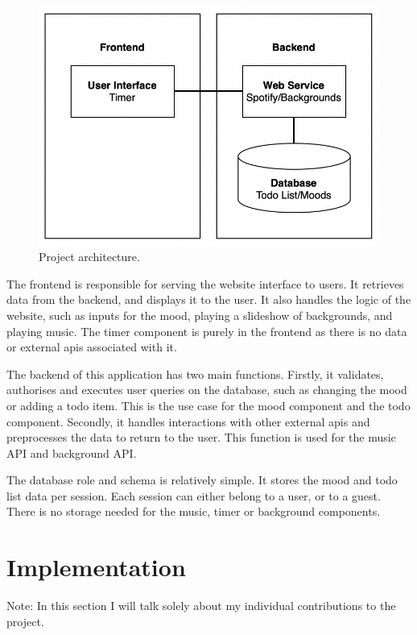 \documentclass[conference]{IEEEtran}
\begin{document}
\begin{figure}[htbp]
\centerline{\includegraphics[width = \linewidth]{project-architecture.png}}
\caption{Project architecture.}
\label{project-architecture}
\end{figure}

The frontend is responsible for serving the website interface to users. It retrieves data from the backend, and displays it to the user. It also handles the logic of the website, such as inputs for the mood, playing a slideshow of backgrounds, and playing music. The timer component is purely in the frontend as there is no data or external apis associated with it.

The backend of this application has two main functions. Firstly, it validates, authorises and executes user queries on the database, such as changing the mood or adding a todo item. This is the use case for the mood component and the todo component. Secondly, it handles interactions with other external apis and preprocesses the data to return to the user. This function is used for the music API and background API.

The database role and schema is relatively simple. It stores the mood and todo list data per session. Each session can either belong to a user, or to a guest. There is no storage needed for the music, timer or background components.

\section{Implementation}
Note: In this section I will talk solely about my individual contributions to the project.
\end{document}
